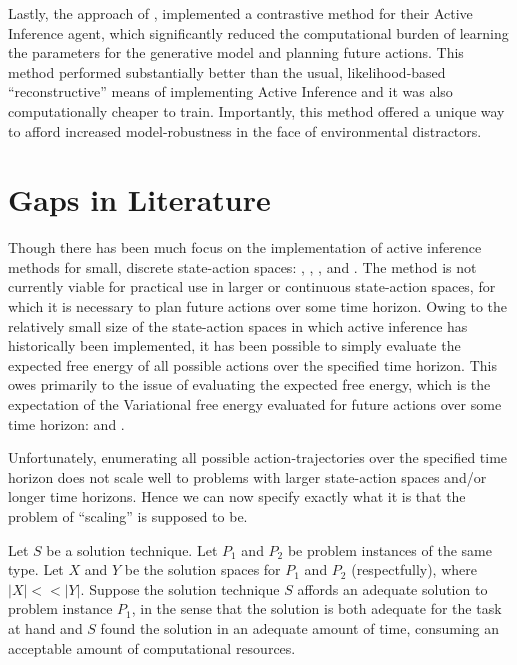 \documentclass[12pt, oneside]{article}
\begin{document}
Lastly, the approach of \textcite{Contrastive-AIF}, implemented a contrastive method for their Active Inference agent, which significantly reduced the computational burden of learning the parameters for the generative model and planning future actions. This method performed substantially better than the usual, likelihood-based ``reconstructive'' means of implementing Active Inference and it was also computationally cheaper to train. Importantly, this method offered a unique way to afford increased model-robustness in the face of environmental distractors. 


\section{Gaps in Literature}
Though there has been much focus on the implementation of active inference methods for small, discrete state-action spaces: \textcite{Applications-of-FEP-Machine-Learning-Neuroscience}, \textcite{AIF-Discrete-Action-Spaces-Synthesis}, \textcite{Step-by-Step-Tutorial-AIF-Empirical-Data}, \textcite{Relationship-Dynamic-Programming-AIF} and \textcite{AIF-Epistemic-Value}. The method is not currently viable for practical use in larger or continuous state-action spaces, for which it is necessary to plan future actions over some time horizon. Owing to the relatively small size of the state-action spaces in which active inference has historically been implemented, it has been possible to simply evaluate the expected free energy of all possible actions over the specified time horizon. This owes primarily to the issue of evaluating the expected free energy, which is the expectation of the Variational free energy evaluated for future actions over some time horizon: \textcite{Message-Passing-Perspective-Planning-Under-AIF} and \textcite{Bayesian-Policy-Selection-Using-AIF}. 

Unfortunately, enumerating all possible action-trajectories over the specified time horizon does not scale well to problems with larger state-action spaces
and/or longer time horizons. Hence we can now specify exactly what it is that the problem of ``scaling'' is supposed to be. 

Let $S$ be a solution technique. Let $P_1$ and $P_2$ be problem instances of the same type. Let $X$ and $Y$ be the solution spaces for $P_1$ and $P_2$ (respectfully), where $|X| << |Y|$. Suppose the solution technique $S$ affords an adequate solution to problem instance $P_1$, in the sense that the solution is both adequate for the task at hand and $S$ found the solution in an adequate amount of time, consuming an acceptable amount of computational resources. 
\end{document}
